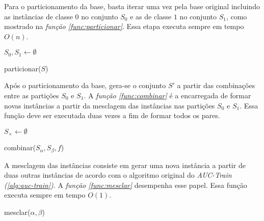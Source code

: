 Para o particionamento da base, basta iterar uma vez pela base original incluindo as instâncias de classe $0$ no conjunto $S_0$ e as de classe $1$ no conjunto $S_1$, como mostrado na \emph{função \ref{func:particionar}}. Essa etapa executa sempre em tempo $O(n)$.

\begin{function}[H]

        $S_0, S_1 \gets \emptyset$



    \caption{particionar($S$)}
    \label{func:particionar}
\end{function}

Após o particionamento da base, gera-se o conjunto $S'$ a partir das combinações entre as partições $S_0$ e $S_1$. A \emph{função \ref{func:combinar}} é a encarregada de formar novas instâncias a partir da mesclagem das instâncias nas partições $S_0$ e $S_1$. Essa função deve ser executada duas vezes a fim de formar todos os pares.

\begin{function}[H]

    $S_{\times} \gets \emptyset$



    \caption{combinar($S_{\alpha}, S_{\beta}, f$)}
    \label{func:combinar}
\end{function}

A mesclagem das instâncias consiste em gerar uma nova instância a partir de duas outras instâncias de acordo com o algoritmo original do \emph{AUC-Train (\ref{alg:auc-train})}. A \emph{função \ref{func:mesclar}} desempenha esse papel. Essa função executa sempre em tempo $O(1)$.

\begin{function}[h]


    \caption{mesclar($\alpha, \beta$)}
    \label{func:mesclar}
\end{function}

